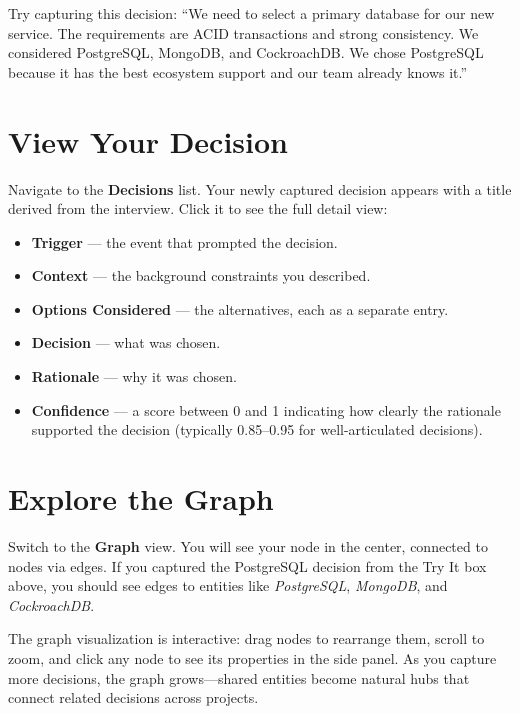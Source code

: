 \begin{tryit}
Try capturing this decision: ``We need to select a primary database for our
new service.  The requirements are ACID transactions and strong consistency.
We considered PostgreSQL, MongoDB, and CockroachDB.  We chose PostgreSQL because
it has the best ecosystem support and our team already knows it.''
\end{tryit}


\section{View Your Decision}
\label{sec:view-decision}

Navigate to the \textbf{Decisions} list.  Your newly captured decision appears
with a title derived from the interview.  Click it to see the full detail view:

\begin{itemize}
    \item \textbf{Trigger} --- the event that prompted the decision.
    \item \textbf{Context} --- the background constraints you described.
    \item \textbf{Options Considered} --- the alternatives, each as a separate
          entry.
    \item \textbf{Decision} --- what was chosen.
    \item \textbf{Rationale} --- why it was chosen.
    \item \textbf{Confidence} --- a score between 0 and 1 indicating how
          clearly the rationale supported the decision (typically 0.85--0.95 for
          well-articulated decisions).
\end{itemize}


\section{Explore the Graph}
\label{sec:explore-graph}

Switch to the \textbf{Graph} view.  You will see your  node
in the center, connected to  nodes via  edges.  If you
captured the PostgreSQL decision from the Try It box above, you should see edges
to entities like \emph{PostgreSQL}, \emph{MongoDB}, and \emph{CockroachDB}.

The graph visualization is interactive: drag nodes to rearrange them, scroll to
zoom, and click any node to see its properties in the side panel.  As you
capture more decisions, the graph grows---shared entities become natural hubs
that connect related decisions across projects.


